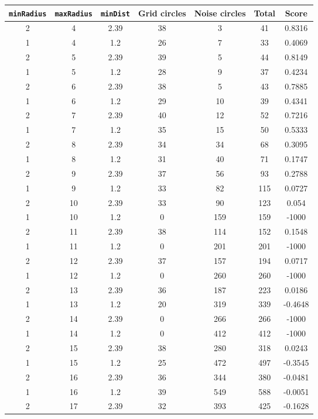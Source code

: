 \documentclass[letterpaper, 12pt]{article}
\begin{document}
\begin{longtable}{|c|c|c|c|c|c|c|}
\hline
\textbf{\texttt{minRadius}} & \textbf{\texttt{maxRadius}} & \textbf{\texttt{minDist}} & \textbf{Grid circles} & \textbf{Noise circles} & \textbf{Total} & \textbf{Score} \\
\hline
2 & 4 & 2.39 & 38 & 3 & 41 & 0.8316 \\
\hline
1 & 4 & 1.2 & 26 & 7 & 33 & 0.4069 \\
\hline
2 & 5 & 2.39 & 39 & 5 & 44 & 0.8149 \\
\hline
1 & 5 & 1.2 & 28 & 9 & 37 & 0.4234 \\
\hline
2 & 6 & 2.39 & 38 & 5 & 43 & 0.7885 \\
\hline
1 & 6 & 1.2 & 29 & 10 & 39 & 0.4341 \\
\hline
2 & 7 & 2.39 & 40 & 12 & 52 & 0.7216 \\
\hline
1 & 7 & 1.2 & 35 & 15 & 50 & 0.5333 \\
\hline
2 & 8 & 2.39 & 34 & 34 & 68 & 0.3095 \\
\hline
1 & 8 & 1.2 & 31 & 40 & 71 & 0.1747 \\
\hline
2 & 9 & 2.39 & 37 & 56 & 93 & 0.2788 \\
\hline
1 & 9 & 1.2 & 33 & 82 & 115 & 0.0727 \\
\hline
2 & 10 & 2.39 & 33 & 90 & 123 & 0.054 \\
\hline
1 & 10 & 1.2 & 0 & 159 & 159 & -1000 \\
\hline
2 & 11 & 2.39 & 38 & 114 & 152 & 0.1548 \\
\hline
1 & 11 & 1.2 & 0 & 201 & 201 & -1000 \\
\hline
2 & 12 & 2.39 & 37 & 157 & 194 & 0.0717 \\
\hline
1 & 12 & 1.2 & 0 & 260 & 260 & -1000 \\
\hline
2 & 13 & 2.39 & 36 & 187 & 223 & 0.0186 \\
\hline
1 & 13 & 1.2 & 20 & 319 & 339 & -0.4648 \\
\hline
2 & 14 & 2.39 & 0 & 266 & 266 & -1000 \\
\hline
1 & 14 & 1.2 & 0 & 412 & 412 & -1000 \\
\hline
2 & 15 & 2.39 & 38 & 280 & 318 & 0.0243 \\
\hline
1 & 15 & 1.2 & 25 & 472 & 497 & -0.3545 \\
\hline
2 & 16 & 2.39 & 36 & 344 & 380 & -0.0481 \\
\hline
1 & 16 & 1.2 & 39 & 549 & 588 & -0.0051 \\
\hline
2 & 17 & 2.39 & 32 & 393 & 425 & -0.1628 \\

\end{longtable}
\end{document}
